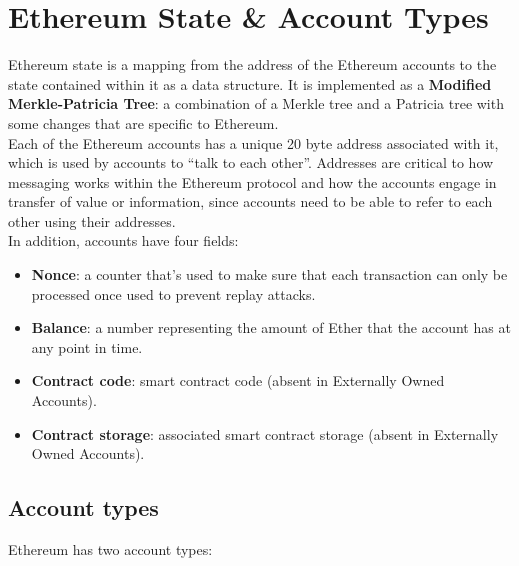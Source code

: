 \section{Ethereum State \& Account Types}

Ethereum state is a mapping from the address of the Ethereum accounts to the state contained within it as a data structure.
It is implemented as a \textbf{Modified Merkle-Patricia Tree}: a combination of a Merkle tree and a Patricia tree with some changes that are specific to Ethereum.\\

Each of the Ethereum accounts has a unique 20 byte address associated with it, which is used by accounts to ``talk to each other''.
Addresses are critical to how messaging works within the Ethereum protocol and how the accounts engage in transfer of value or information, since accounts need to be able to refer to each other using their addresses.\\

In addition, accounts have four fields:

\begin{itemize}

    \item\textbf{Nonce}: a counter that's used to make sure that each transaction can only be processed once used to prevent replay attacks.
    
    \item\textbf{Balance}: a number representing the amount of Ether that the account has at any point in time.
    
    \item\textbf{Contract code}: smart contract code (absent in Externally Owned Accounts).
    
    \item\textbf{Contract storage}: associated smart contract storage (absent in Externally Owned Accounts).

\end{itemize}

\subsection*{Account types}

Ethereum has two account types:

